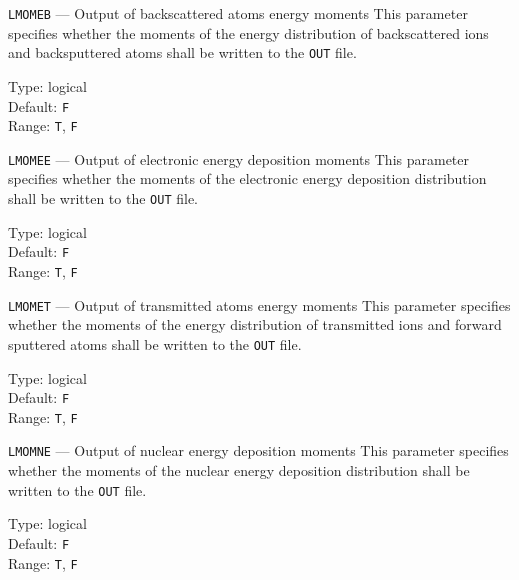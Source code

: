 \begin{keydescription}{\texttt{LMOMEB} --- Output of backscattered atoms
energy moments}
%
  This parameter specifies whether the moments of the energy distribution 
  of backscattered ions and backsputtered atoms shall be written to the
  \texttt{OUT} file. 
  \begin{keytab}
    Type:    \> logical \\
    Default: \> \texttt{F} \\
    Range:   \> \texttt{T}, \texttt{F} 
  \end{keytab}
\end{keydescription}

\begin{keydescription}{\texttt{LMOMEE} --- Output of electronic energy deposition moments}
%
  This parameter specifies whether the moments of the electronic energy
  deposition distribution shall be written to the \texttt{OUT} file.
  \begin{keytab}
    Type:    \> logical \\
    Default: \> \texttt{F} \\
    Range:   \> \texttt{T}, \texttt{F} 
  \end{keytab}
\end{keydescription}

\begin{keydescription}{\texttt{LMOMET} --- Output of transmitted atoms energy
moments}
%
  This parameter specifies whether the moments of the energy distribution 
  of transmitted ions and forward sputtered atoms shall be written to
  the \texttt{OUT} file. 
  \begin{keytab}
    Type:    \> logical \\
    Default: \> \texttt{F} \\
    Range:   \> \texttt{T}, \texttt{F} 
  \end{keytab}
\end{keydescription}

\begin{keydescription}{\texttt{LMOMNE} --- Output of nuclear energy deposition moments}
%
  This parameter specifies whether the moments of the nuclear energy deposition distribution 
  shall be written to the \texttt{OUT} file.
  \begin{keytab}
    Type:    \> logical \\
    Default: \> \texttt{F} \\
    Range:   \> \texttt{T}, \texttt{F} 
  \end{keytab}
\end{keydescription}

